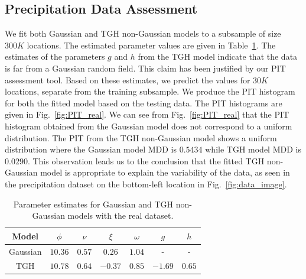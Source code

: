 \documentclass[conference]{IEEEtran}
\begin{document}
\subsection{Precipitation Data Assessment}  
We fit both Gaussian and TGH non-Gaussian models to a subsample of 
size $300K$ locations. The estimated parameter values are 
given in Table~\ref{table:estimates}. The estimates of the 
parameters $g$ and $h$ from the TGH model indicate that 
the data is far from a Gaussian random field. This claim has 
been justified by our PIT assessment tool. Based on these 
estimates, we predict the values for $30K$ locations, separate 
from the training subsample. We produce the PIT histogram for 
both the fitted model based on the testing data. The PIT histograms
are given in Fig.~\ref{fig:PIT_real}. We can see from Fig.~\ref{fig:PIT_real} that the PIT histogram obtained from the Gaussian model does not correspond to a uniform distribution. The PIT
from the TGH non-Gaussian model shows a uniform distribution where
the Gaussian model MDD is $0.5434$ while TGH model MDD is $0.0290$. This observation leads us to the conclusion that the fitted TGH non-Gaussian model 
is appropriate to explain the variability of the data, as seen in the precipitation dataset
on the bottom-left location in Fig.~\ref{fig:data_image}. 

\begin{table}
\begin{center}
\begin{tabular}{ |c|c|c|c|c|c|c| } 
 \hline
 Model & $\phi$ & $\nu$ & $\xi$ & $\omega$& $g$ & $h$  \\
 \hline 
Gaussian & $10.36$ & $0.57$ & $0.26$ & $1.04$ & -  & -   \\
 \hline
 TGH & $10.78$ & $0.64$ & $-0.37$ & $0.85$ & $-1.69$ & $0.65$ \\
 \hline
 \end{tabular}
\end{center}
\caption{Parameter estimates for Gaussian and TGH non-Gaussian models with the real dataset.}
\label{table:estimates}
\end{table}

\end{document}
